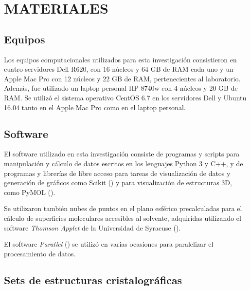 \newpage
\section*{MATERIALES}
\par{}
\subsection{Equipos}
\par
Los equipos computacionales utilizados para esta investigación consistieron en cuatro servidores Dell R620, con 16 núcleos y 64 GB de RAM cada uno y un Apple Mac Pro con 12 núcleos y 22 GB de RAM, pertenecientes al laboratorio. 
Además, fue utilizado un laptop personal HP 8740w con 4 núcleos y 20 GB de RAM. 
Se utilizó el sistema operativo CentOS 6.7 en los servidores Dell y Ubuntu 16.04 tanto en el Apple Mac Pro como en el laptop personal.
\subsection{Software}
\par
El software utilizado en esta investigación consiste de programas y scripts para manipulación y cálculo de datos escritos en los lenguajes Python 3 y C++, y de programas y librerías de libre acceso para tareas de visualización de datos y generación de gráficos como Scikit (\cite{Pedregosa2012}) y para visualización de estructuras 3D, como PyMOL (\cite{PyMOL}).
\par
Se utilizaron también nubes de puntos en el plano esférico precalculadas para el cálculo de superficies moleculares accesibles al solvente, adquiridas utilizando el software \textit{Thomson Applet} de la Universidad de Syracuse (\cite{Saff1997,thomson}).
\par
El software \textit{Parallel} (\cite{Tange2011a}) se utilizó en varias ocasiones para paralelizar el procesamiento de datos.

\subsection{Sets de estructuras cristalográficas}

